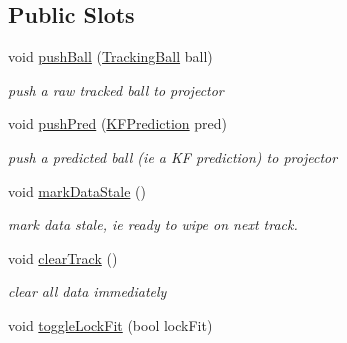 \subsection*{Public Slots}
\begin{DoxyCompactItemize}
\item 
void \hyperlink{classProjectorWindow_a8f638b18d4be3fe6a02403d5d078334f}{push\+Ball} (\hyperlink{classTrackingBall}{Tracking\+Ball} ball)\hypertarget{classProjectorWindow_a8f638b18d4be3fe6a02403d5d078334f}{}\label{classProjectorWindow_a8f638b18d4be3fe6a02403d5d078334f}

\begin{DoxyCompactList}\small\item\em push a raw tracked ball to projector \end{DoxyCompactList}\item 
void \hyperlink{classProjectorWindow_ae28f1f23d78c5bcb59feb14746194e1f}{push\+Pred} (\hyperlink{classKFPrediction}{K\+F\+Prediction} pred)\hypertarget{classProjectorWindow_ae28f1f23d78c5bcb59feb14746194e1f}{}\label{classProjectorWindow_ae28f1f23d78c5bcb59feb14746194e1f}

\begin{DoxyCompactList}\small\item\em push a predicted ball (ie a KF prediction) to projector \end{DoxyCompactList}\item 
void \hyperlink{classProjectorWindow_a52c94c89533c41a5c73f95b6714407f1}{mark\+Data\+Stale} ()
\begin{DoxyCompactList}\small\item\em mark data stale, ie ready to wipe on next track. \end{DoxyCompactList}\item 
void \hyperlink{classProjectorWindow_a5a16a1f32bbe563d08c2bea8f4f8a487}{clear\+Track} ()\hypertarget{classProjectorWindow_a5a16a1f32bbe563d08c2bea8f4f8a487}{}\label{classProjectorWindow_a5a16a1f32bbe563d08c2bea8f4f8a487}

\begin{DoxyCompactList}\small\item\em clear all data immediately \end{DoxyCompactList}\item 
void \hyperlink{classProjectorWindow_a8ad0fc4fba0ddcbc8af2491b8020e290}{toggle\+Lock\+Fit} (bool lock\+Fit)\hypertarget{classProjectorWindow_a8ad0fc4fba0ddcbc8af2491b8020e290}{}\label{classProjectorWindow_a8ad0fc4fba0ddcbc8af2491b8020e290}


\end{DoxyCompactItemize}
